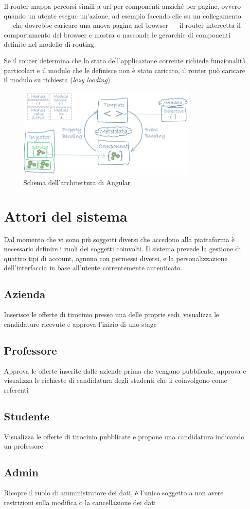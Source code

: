 Il router mappa percorsi simili a \acrshort{url} per componenti anziché per pagine, ovvero quando un utente esegue un'azione, ad esempio facendo clic su un collegamento --- che dovrebbe caricare una nuova pagina nel browser --- il router intercetta il comportamento del browser e mostra o nasconde le gerarchie di componenti definite nel modello di routing.

Se il router determina che lo stato dell'applicazione corrente richiede funzionalità particolari e il modulo che le definisce non è stato caricato, il router può caricare il modulo su richiesta (\textit{lazy loading}).

\begin{figure}[!h] 
	\centering    
	\includegraphics[width=0.8\textwidth]{Chapter1/Figs/angular-overview}
	\caption[Architettura di Angular]{Schema dell'architettura di Angular\cite{angularoverview}}
	\label{fig:angular-overview}
\end{figure}

\section{Attori del sistema}

Dal momento che vi sono più soggetti diversi che accedono alla piattaforma è necessario definire i ruoli dei soggetti coinvolti. Il sistema prevede la gestione di quattro tipi di account, ognuno con permessi diversi, e la personalizzazione dell'interfaccia in base all'utente correntemente autenticato.

\subsection{Azienda}
Inserisce le offerte di tirocinio presso una delle proprie sedi, visualizza le candidature ricevute e approva l'inizio di uno stage

\subsection{Professore}
Approva le offerte inserite dalle aziende prima che vengano pubblicate, approva e visualizza le richieste di candidatura degli studenti che li coinvolgono come referenti

\subsection{Studente}
Visualizza le offerte di tirocinio pubblicate e propone una candidatura indicando un professore

\subsection{Admin}
Ricopre il ruolo di amministratore dei dati, è l'unico soggetto a non avere restrizioni sulla modifica o la cancellazione dei dati